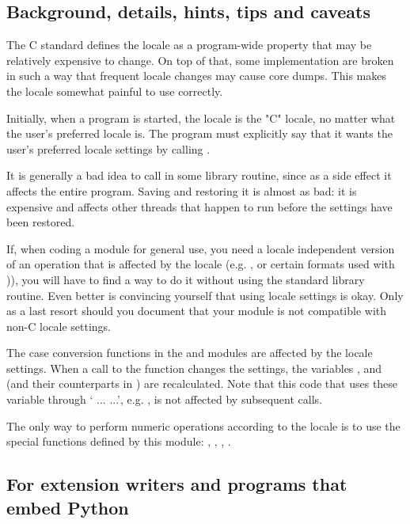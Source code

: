 \subsection{Background, details, hints, tips and caveats}

The C standard defines the locale as a program-wide property that may
be relatively expensive to change.  On top of that, some
implementation are broken in such a way that frequent locale changes
may cause core dumps.  This makes the locale somewhat painful to use
correctly.

Initially, when a program is started, the locale is the "C" locale, no
matter what the user's preferred locale is.  The program must
explicitly say that it wants the user's preferred locale settings by
calling .

It is generally a bad idea to call  in some library
routine, since as a side effect it affects the entire program.  Saving
and restoring it is almost as bad: it is expensive and affects other
threads that happen to run before the settings have been restored.

If, when coding a module for general use, you need a locale
independent version of an operation that is affected by the locale
(e.g. , or certain formats used with
)), you will have to find a way to do it
without using the standard library routine.  Even better is convincing
yourself that using locale settings is okay.  Only as a last resort
should you document that your module is not compatible with non-C
locale settings.

The case conversion functions in the
 and
 modules are affected by the locale
settings.  When a call to the  function changes
the  settings, the variables
,  and
 (and their counterparts in ) are
recalculated.  Note that this code that uses these variable through
` ...  ...', e.g. , is not affected by subsequent 
calls.

The only way to perform numeric operations according to the locale
is to use the special functions defined by this module:
, , ,
.

\subsection{For extension writers and programs that embed Python}

